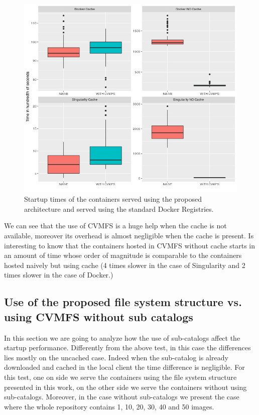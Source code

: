 \begin{figure}[]{}
    \includegraphics[width=\textwidth]{gfx/plot-startup-time}
        \caption{Startup times of the containers served using the proposed architecture and served using the standard Docker Registries.}
        \label{fig:startup-time}
\end{figure}


We can see that the use of CVMFS is a huge help when the cache is not
available, moreover its overhead is almost negligible when the cache is
present. Is interesting to know that the containers hosted in CVMFS without
cache starts in an amount of time whose order of magnitude is comparable to the
containers hosted naively but using cache (4 times slower in the case of
Singularity and 2 times slower in the case of Docker.)

\subsection{Use of the proposed file system structure vs. using CVMFS without sub catalogs}

In this section we are going to analyze how the use of sub-catalogs affect the
startup performance. Differently from the above test, in this case the
differences lies mostly on the uncached case. Indeed when the sub-catalog is
already downloaded and cached in the local client the time difference is
negligible. For this test, one on side we serve the containers using the file
system structure presented in this work, on the other side we serve the
containers without using sub-catalogs. Moreover, in the case without
sub-catalogs we present the case where the whole repository contains 1, 10,
20, 30, 40 and 50 images.

